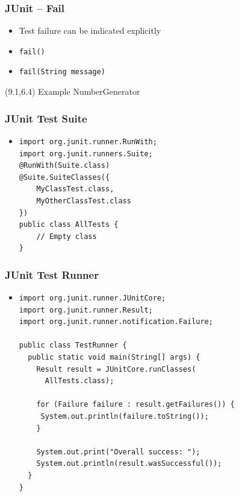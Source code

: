 \documentclass[10pt,xcolor=pdflatex]{beamer}
\begin{document}
\begin{frame}\frametitle{JUnit -- Fail}
\begin{itemize}
    \item Test failure can be indicated explicitly
	\item \texttt{fail()}
 	\item \texttt{fail(String message)}
\end{itemize}
\begin{textblock}{5}(9.1,6.4)
    {\footnotesize Example NumberGenerator}
\end{textblock}
\end{frame}


\begin{frame}[containsverbatim]\frametitle{JUnit Test Suite}
\begin{itemize}
	\item [] \begin{verbatim}
import org.junit.runner.RunWith;
import org.junit.runners.Suite;
@RunWith(Suite.class)
@Suite.SuiteClasses({
    MyClassTest.class,
    MyOtherClassTest.class
})
public class AllTests {
    // Empty class
}    
    \end{verbatim}
\end{itemize}
\end{frame}


\begin{frame}[containsverbatim]\frametitle{JUnit Test Runner}
\begin{itemize}
	\item [] \begin{verbatim}
import org.junit.runner.JUnitCore;
import org.junit.runner.Result;
import org.junit.runner.notification.Failure;

public class TestRunner {
  public static void main(String[] args) {
    Result result = JUnitCore.runClasses(
      AllTests.class);

    for (Failure failure : result.getFailures()) {
     System.out.println(failure.toString());
    }
    
    System.out.print("Overall success: ");
    System.out.println(result.wasSuccessful());
  }
}  
\end{verbatim}
\end{itemize}
\end{frame}
\end{document}
